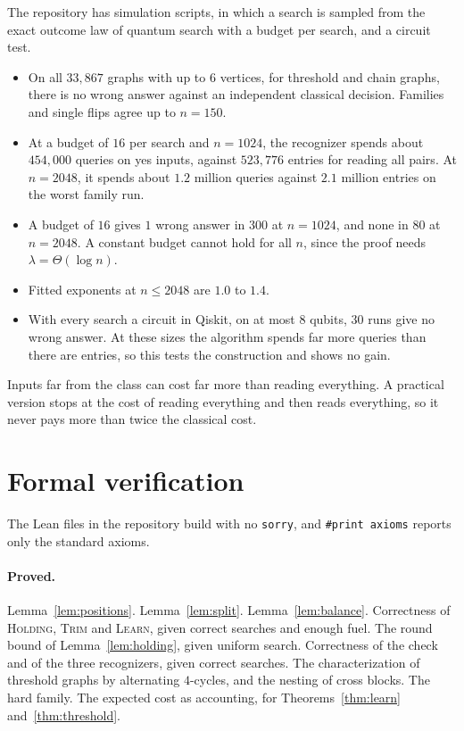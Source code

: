 \documentclass[11pt]{article}
\theoremstyle{remark}
\newcommand{\AlgHold}{\textup{\textsc{Holding}}}
\newcommand{\AlgTrim}{\textup{\textsc{Trim}}}
\newcommand{\AlgLearn}{\textup{\textsc{Learn}}}
\begin{document}
The repository has simulation scripts, in which a search is sampled from the exact outcome law of quantum search with a budget per search, and a circuit test.
\begin{itemize}[leftmargin=1.5em]
\item On all $33{,}867$ graphs with up to $6$ vertices, for threshold and chain graphs, there is no wrong answer against an independent classical decision. Families and single flips agree up to $n=150$.
\item At a budget of $16$ per search and $n=1024$, the recognizer spends about $454{,}000$ queries on yes inputs, against $523{,}776$ entries for reading all pairs. At $n=2048$, it spends about $1.2$ million queries against $2.1$ million entries on the worst family run.
\item A budget of $16$ gives $1$ wrong answer in $300$ at $n=1024$, and none in $80$ at $n=2048$. A constant budget cannot hold for all $n$, since the proof needs $\lambda=\Theta(\log n)$.
\item Fitted exponents at $n\le 2048$ are $1.0$ to $1.4$.
\item With every search a circuit in Qiskit, on at most $8$ qubits, $30$ runs give no wrong answer. At these sizes the algorithm spends far more queries than there are entries, so this tests the construction and shows no gain.
\end{itemize}
Inputs far from the class can cost far more than reading everything. A practical version stops at the cost of reading everything and then reads everything, so it never pays more than twice the classical cost.

\section{Formal verification}\label{sec:lean}

The Lean files in the repository build with no \texttt{sorry}, and \texttt{\#print axioms} reports only the standard axioms.

\paragraph{Proved.} Lemma~\ref{lem:positions}. Lemma~\ref{lem:split}. Lemma~\ref{lem:balance}. Correctness of \AlgHold, \AlgTrim{} and \AlgLearn, given correct searches and enough fuel. The round bound of Lemma~\ref{lem:holding}, given uniform search. Correctness of the check and of the three recognizers, given correct searches. The characterization of threshold graphs by alternating $4$-cycles, and the nesting of cross blocks. The hard family. The expected cost as accounting, for Theorems~\ref{thm:learn} and~\ref{thm:threshold}.
\end{document}
